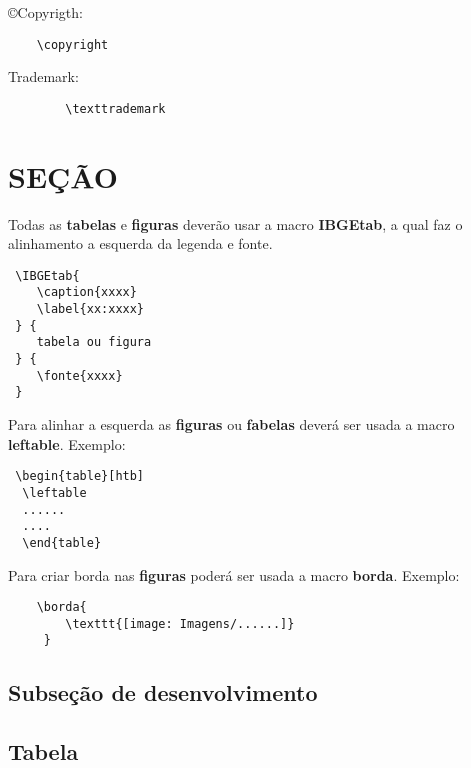\copyright Copyrigth:
	\begin{verbatim}
	\copyright
	\end{verbatim}
	
	\texttrademark Trademark:
		\begin{verbatim}
		\texttrademark
		\end{verbatim}
		
\section{SEÇÃO}

 Todas as \textbf{tabelas} e \textbf{figuras} deverão usar a macro \textbf{IBGEtab}, a qual faz o alinhamento a esquerda da legenda e fonte.
 \begin{verbatim}
 \IBGEtab{
 	\caption{xxxx} 
 	\label{xx:xxxx}
 } {
 	tabela ou figura
 } {
 	\fonte{xxxx}
 }
 \end{verbatim} 
 
 Para alinhar a esquerda as \textbf{figuras} ou \textbf{fabelas} deverá ser usada a macro  \textbf{leftable}. Exemplo:
 \begin{verbatim}
 \begin{table}[htb]
  \leftable
  ......
  ....
  \end{table}
 \end{verbatim}
 
 Para criar borda nas \textbf{figuras} poderá ser usada a macro \textbf{borda}. Exemplo:
 \begin{verbatim}
 	\borda{
  		\texttt{[image: Imagens/......]}
     }
 \end{verbatim}
 
\subsection{Subseção de desenvolvimento}

\lipsum[1-1]

\subsection{Tabela}
\begin{table}[htb]
  \leftable  %
\end{table}

